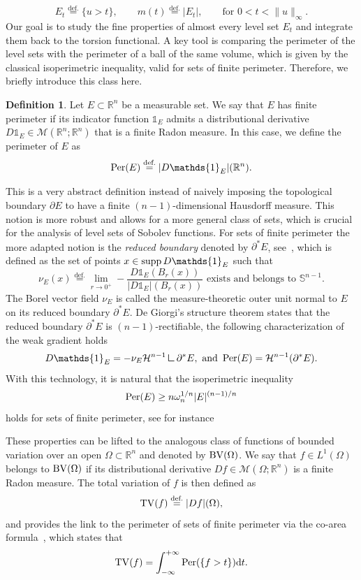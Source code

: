 \documentclass[11pt]{amsart}
\newcommand{\definame}{Definition}
\theoremstyle{plain}
\theoremstyle{definition}
\newtheorem{definition}[theorem]{\definame}
\newcommand{\eqdef}{\overset{\text{def.}}{=}}
\def\dd{{\rm d}}
\newcommand{\mres}{\mathbin{\vrule height 1.6ex depth 0pt width
		0.13ex\vrule height 0.13ex depth 0pt width 1.3ex}}
\newcommand\TV{\mathop{\rm TV}}
\newcommand\BV{\mathop{\rm BV}}
\newcommand\Per{\mathop{\rm Per}}
\newcommand\supp{\mathop{\rm supp}}
\begin{document}
 \[
  E_t\eqdef\{u>t\},\qquad m(t)\eqdef|E_t|,\qquad \text{for }0<t<\|u\|_\infty.
\]
Our goal is to study the fine properties of almost every level set $E_t$ and integrate them back to the torsion functional. A key tool is comparing the perimeter of the level sets with the perimeter of a ball of the same volume, which is given by the classical isoperimetric inequality, valid for sets of finite perimeter. Therefore, we briefly introduce this class here.
\begin{definition}\label{def.set_finite_perimeter}
    Let $E\subset\mathbb{R}^n$ be a measurable set. We say that $E$ has finite perimeter if its indicator function $\mathds{1}_{E}$ admits a distributional derivative $D\mathds{1}_{E} \in \mathscr{M}(\mathbb{R}^n;\mathbb{R}^n)$ that is a finite Radon measure. In this case, we define the perimeter of $E$ as
    \[
      \Per(E) \eqdef |D\mathds{1}_{E}|(\mathbb{R}^n).
    \]
\end{definition}

This is a very abstract definition instead of naively imposing the topological boundary $\partial E$ to have a finite $(n-1)$-dimensional Hausdorff measure. This notion is more robust and allows for a more general class of sets, which is crucial for the analysis of level sets of Sobolev functions. For sets of finite perimeter the more adapted notion is the \textit{reduced boundary} denoted by $\partial^* E$, see~\cite[Chapter~15]{maggi2012sets}, which is defined as the set of points $x \in \supp D \mathds{1}_E$ such that
\[
  \nu_E(x)\eqdef
  \lim_{r \to 0^+}
  -\frac{D \mathds{1}_E(B_r(x))}{|D \mathds{1}_E|(B_r(x))}
  \text{ exists and belongs to }
  \mathbb{S}^{n-1}.
\]
The Borel vector field $\nu_E$ is called the measure-theoretic outer unit normal to $E$ on its reduced boundary $\partial^* E$. De Giorgi's structure theorem states that the reduced boundary $\partial^* E$ is $(n-1)$-rectifiable, the following characterization of the weak gradient holds
\begin{equation}\label{eq.charac_indicator_weak_grad}
  D\mathds{1}_E = -\nu_E \mathcal{H}^{n-1}\mres\partial^* E,
  \text{ and }
  \Per(E) = \mathcal{H}^{n-1}(\partial^* E).
\end{equation}
With this technology, it is natural that the isoperimetric inequality
\[
  \Per(E) \ge n\omega_n^{1/n}|E|^{(n-1)/n}
\]
holds for sets of finite perimeter, see for instance~\cite{ambrosio2000functions,maggi2012sets}

These properties can be lifted to the analogous class of functions of bounded variation over an open $\Omega \subset \mathbb{R}^n$ and denoted by $\BV(\Omega)$. We say that $f \in L^1(\Omega)$ belongs to $\BV(\Omega)$ if its distributional derivative $Df \in \mathscr{M}(\Omega;\mathbb{R}^n)$ is a finite Radon measure. The total variation of $f$ is then defined as
\[
  \TV(f) \eqdef |Df|(\Omega),
\]
and provides the link to the perimeter of sets of finite perimeter via the co-area formula~\cite{ambrosio2000functions,EvansGariepy2015}, which states that
\[
  \TV(f) = \int_{-\infty}^{+\infty} \Per(\{f>t\}) \dd t.
\]
\end{document}

